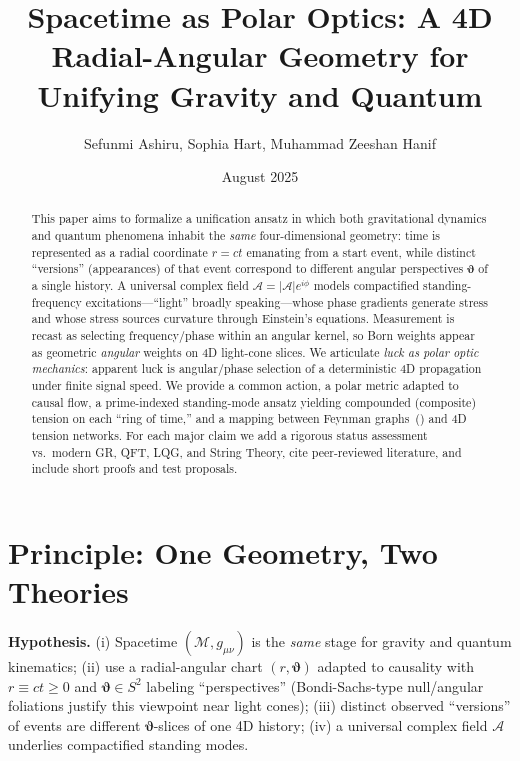 \documentclass[reprint,amsmath,amssymb,aps,pra]{revtex4-2} %
\newcommand{\M}{\mathcal{M}}                   %
\newcommand{\g}{g}                             %
\newcommand{\A}{\mathcal{A}}                   %
\newcommand{\angb}{\boldsymbol{\vartheta}}     %
\begin{document}
\title{Spacetime as Polar Optics: A 4D Radial-Angular Geometry for Unifying Gravity and Quantum}
\author{Sefunmi Ashiru, Sophia Hart, Muhammad Zeeshan Hanif}
\date{August 2025}

\begin{abstract}
This paper aims to formalize a unification ansatz in which both gravitational dynamics and quantum phenomena inhabit the \emph{same} four-dimensional geometry: time is represented as a radial coordinate $r=ct$ emanating from a start event, while distinct ``versions'' (appearances) of that event correspond to different angular perspectives $\angb$ of a single history. A universal complex field $\A=|\A|e^{i\phi}$ models compactified standing-frequency excitations---``light'' broadly speaking---whose phase gradients generate stress and whose stress sources curvature through Einstein's equations. Measurement is recast as selecting frequency/phase within an angular kernel, so Born weights appear as geometric \emph{angular} weights on 4D light-cone slices. We articulate \emph{luck as polar optic mechanics}: apparent luck is angular/phase selection of a deterministic 4D propagation under finite signal speed. We provide a common action, a polar metric adapted to causal flow, a prime-indexed standing-mode ansatz yielding compounded (composite) tension on each ``ring of time,'' and a mapping between Feynman graphs~(\cite{FeynmanHibbs1965}) and 4D tension networks. For each major claim we add a rigorous status assessment vs.~modern GR, QFT, LQG, and String Theory, cite peer-reviewed literature, and include short proofs and test proposals.
\end{abstract}

\maketitle

\section{Principle: One Geometry, Two Theories}
\textbf{Hypothesis.}
(i) Spacetime $(\M,\g_{\mu\nu})$ is the \emph{same} stage for gravity and quantum kinematics; (ii) use a radial-angular chart $(r,\angb)$ adapted to causality with $r\equiv ct\ge 0$ and $\angb\in S^2$ labeling ``perspectives'' (Bondi-Sachs-type null/angular foliations justify this viewpoint near light cones); (iii) distinct observed ``versions'' of events are different $\angb$-slices of one 4D history; (iv) a universal complex field $\A$ underlies compactified standing modes.
\end{document}
